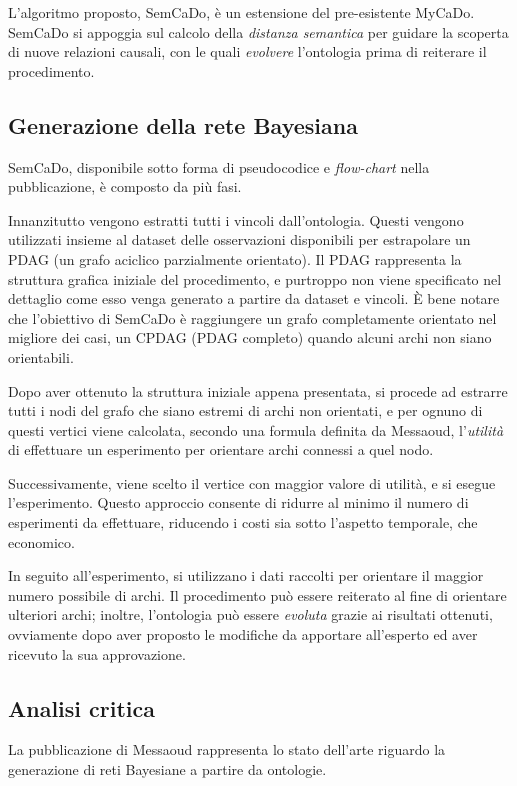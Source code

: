 L'algoritmo proposto, SemCaDo\cite{messaoud2015}, è un estensione del pre-esistente MyCaDo. {SemCaDo} si appoggia sul calcolo della \textit{distanza semantica} per guidare la scoperta di nuove relazioni causali, con le quali \textit{evolvere} l'ontologia prima di reiterare il procedimento.


\subsection{Generazione della rete Bayesiana}
SemCaDo, disponibile sotto forma di pseudocodice e \textit{flow-chart} nella pubblicazione, è composto da più fasi.

Innanzitutto vengono estratti tutti i vincoli dall'ontologia. 
Questi vengono utilizzati insieme al dataset delle osservazioni disponibili per estrapolare un PDAG (un grafo aciclico parzialmente orientato). Il PDAG rappresenta la struttura grafica iniziale del procedimento, e purtroppo non viene specificato nel dettaglio come esso venga generato a partire da dataset e vincoli. È bene notare che l'obiettivo di SemCaDo è raggiungere un grafo completamente orientato nel migliore dei casi, un CPDAG (PDAG completo) quando alcuni archi non siano orientabili.

Dopo aver ottenuto la struttura iniziale appena presentata, si procede ad estrarre tutti i nodi del grafo che siano estremi di archi non orientati, e per ognuno di questi vertici viene calcolata, secondo una formula definita da Messaoud, l'\textit{utilità} di effettuare un esperimento per orientare archi connessi a quel nodo.

Successivamente, viene scelto il vertice con maggior valore di utilità, e si esegue l'esperimento. Questo approccio consente di ridurre al minimo il numero di esperimenti da effettuare, riducendo i costi sia sotto l'aspetto temporale, che economico.

In seguito all'esperimento, si utilizzano i dati raccolti per orientare il maggior numero possibile di archi.
Il procedimento può essere reiterato al fine di orientare ulteriori archi; inoltre, l'ontologia può essere \textit{evoluta} grazie ai risultati ottenuti, ovviamente dopo aver proposto le modifiche da apportare all'esperto ed aver ricevuto la sua approvazione.


\subsection{Analisi critica}
La pubblicazione di Messaoud rappresenta lo stato dell'arte riguardo la generazione di reti Bayesiane a partire da ontologie. 

